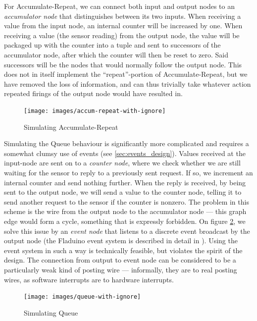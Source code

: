 \documentclass[a4paper, oneside, final]{memoir}
\let\Fref\undefined
\begin{document}
For Accumulate-Repeat, we can connect both input and output nodes to
an \textit{accumulator node} that distinguishes between its two
inputs.  When receiving a value from the input node, an internal
counter will be increased by one.  When receiving a value (the sensor
reading) from the output node, the value will be packaged up with the
counter into a tuple and sent to successors of the accumulator node,
after which the counter will then be reset to zero.  Said successors
will be the nodes that would normally follow the output node.  This
does not in itself implement the ``repeat''-portion of
Accumulate-Repeat, but we have removed the loss of information, and
can thus trivially take whatever action repeated firings of the output
node would have resulted in.

\begin{figure}
  \texttt{[image: images/accum-repeat-with-ignore]}
  \caption{Simulating Accumulate-Repeat}
  \centering
  \label{accum-repeat-with-ignore}
\end{figure}

Simulating the Queue behaviour is significantly more complicated and
requires a somewhat clumsy use of events (see
\ref{sec:events_design}).  Values received at the input-node are sent
on to a \textit{counter node}, where we check whether we are still
waiting for the sensor to reply to a previously sent request.  If so,
we increment an internal counter and send nothing further.  When the
reply is received, by being sent to the output node, we will send a
value to the counter node, telling it to send another request to the
sensor if the counter is nonzero.  The problem in this scheme is the
wire from the output node to the accumulator node --- this graph edge
would form a cycle, something that is expressly forbidden.  On figure
\ref{queue-with-ignore}, we solve this issue by an \textit{event node}
that listens to a discrete event broadcast by the output node (the
Fladuino event system is described in detail in
\Fref{sec:events_design}).  Using the event system in such a way is
technically feasible, but violates the spirit of the design.  The
connection from output to event node can be considered to be a
particularly weak kind of posting wire --- informally, they are to
real posting wires, as software interrupts are to hardware interrupts.

\begin{figure}
  \texttt{[image: images/queue-with-ignore]}
  \caption{Simulating Queue}
  \centering
  \label{queue-with-ignore}
\end{figure}
\end{document}
